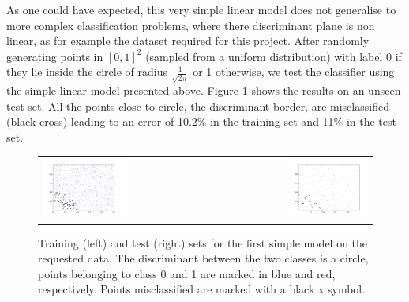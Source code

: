 \documentclass{article}
\begin{document}
As one could have expected, this very simple linear model does not generalise to more complex classification problems, where there discriminant plane is non linear, as  for example the dataset required for this project. 
After  randomly generating points  in $[0,1]^2$  (sampled from a uniform distribution) with label 0 if they lie inside the circle of radius $\frac{1}{\sqrt{2 \pi}}$ or 1 otherwise, we test the classifier using  the simple linear model presented above.
Figure \ref{fig_circle_simple} shows the results on an unseen test set.
All the points close to circle, the discriminant border, are misclassified (black cross) leading to an error of 10.2\% in the training set and 11\% in the test set. 
  \begin{figure}[h]
 \begin{center}
\begin{tabular}{l r}
  \includegraphics[width=0.5\textwidth]{fig/fig_circ_simplemodel_102err_train} & 
  \includegraphics[width=0.5\textwidth]{fig/fig_circ_simplemodel_11err_test} \\
  \end{tabular}
   \caption{Training (left) and test (right) sets for the first simple model on the requested data. The discriminant between the two classes is a circle, points belonging to class 0 and 1 are marked in blue and red, respectively. Points misclassified are marked with a black x symbol.  \label{fig_circle_simple}}
  \end{center}
  \end{figure}
  
\end{document}

